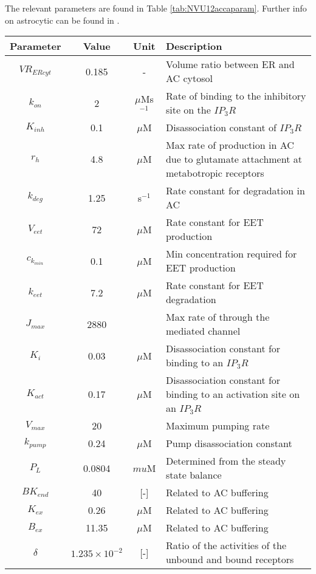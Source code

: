 	The relevant parameters are found in Table \ref{tab:NVU12accaparam}. Further info on astrocytic \ca can be found in \cite{Farr2011}.
				
				\begin{table}[p!]
					\small
					\centering
						\begin{tabular}{c c c p{110mm}}
					\hline
					Parameter & Value & Unit & Description \\
					\hline
					$VR_{ERcyt}$ & 0.185 & - & Volume ratio between ER and AC cytosol \\
					$k_{on}$ & 2 & $\mu$Ms$^{-1}$ & Rate of \ca binding to the inhibitory site on the $IP_3R$ \\
					$K_{inh}$ & 0.1 & $\mu$M & Disassociation constant of $IP_3R$ \\
					$r_h$ & 4.8 & $\mu$M & Max rate of \ip production in AC due to glutamate attachment at metabotropic receptors \\
					$k_{deg}$ & 1.25 & s$^{-1}$ & Rate constant for \ip degradation in AC \\
					$V_{eet}$ & 72 & $\mu$M & Rate constant for EET production \\
					$c_{k_{min}}$ & 0.1 & $\mu$M & Min \ca concentration required for EET production \\
					$k_{eet}$ & 7.2 & $\mu$M & Rate constant for EET degradation \\
					$J_{max}$ & 2880 & \mus & Max rate of \ca through the \ip mediated channel \\
					$K_i$ & 0.03 & $\mu$M & Disassociation constant for \ip binding to an $IP_3R$ \\
					$K_{act}$ & 0.17 & $\mu$M & Disassociation constant for \ca binding to an activation site on an $IP_3R$ \\
					$V_{max}$ & 20 & \mus & Maximum pumping rate \\
					$k_{pump}$ & 0.24 & $\mu$M & Pump disassociation constant \\
					$P_L$ & 0.0804 & $mu$M & Determined from the steady state \ca balance \\
					$BK_{end}$ & 40 & [-] & Related to AC buffering \\
					$K_{ex}$ & 0.26 & $\mu$M & Related to AC buffering \\
					$B_{ex}$ & 11.35 & $\mu$M & Related to AC buffering \\
					$\delta$ & $1.235 \times 10^{-2}$ & [-] & Ratio of the activities of the unbound and bound receptors \\

\end{tabular}
\end{table}

